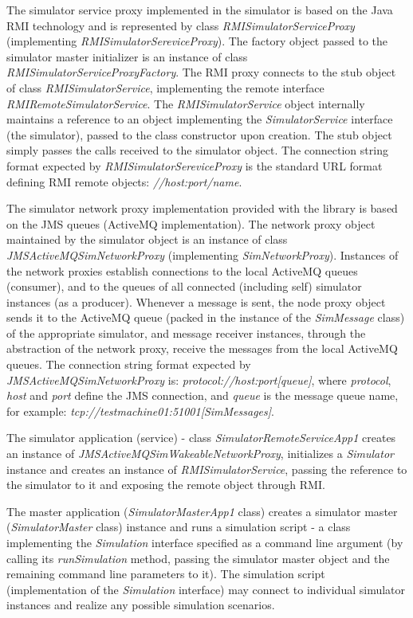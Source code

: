 The simulator service proxy implemented in the simulator is based on the Java RMI technology and is represented by class \emph{RMISimulatorServiceProxy} (implementing \emph{RMISimulatorSereviceProxy}). The factory object passed to the simulator master initializer is an instance of class \emph{RMISimulatorServiceProxyFactory}. The RMI proxy connects to the stub object of class \emph{RMISimulatorService}, implementing the remote interface \emph{RMIRemoteSimulatorService}. The \emph{RMISimulatorService} object internally maintains a reference to an object implementing the \emph{SimulatorService} interface (the simulator), passed to the class constructor upon creation. The stub object simply passes the calls received to the simulator object. The connection string format expected by \emph{RMISimulatorSereviceProxy} is the standard URL format defining RMI remote objects: \emph{//host:port/name}.

The simulator network proxy implementation provided with the library is based on the JMS queues (ActiveMQ implementation). The network proxy object maintained by the simulator object is an instance of class \emph{JMSActiveMQSimNetworkProxy} (implementing \emph{SimNetworkProxy}). Instances of the network proxies establish connections to the local ActiveMQ queues (consumer), and to the queues of all connected (including self) simulator instances (as a producer). Whenever a message is sent, the node proxy object sends it to the ActiveMQ queue (packed in the instance of the \emph{SimMessage} class) of the appropriate simulator, and message receiver instances, through the abstraction of the network proxy, receive the messages from the local ActiveMQ queues. The connection string format expected by \emph{JMSActiveMQSimNetworkProxy} is: \emph{protocol://host:port[queue]}, where \emph{protocol}, \emph{host} and \emph{port} define the JMS connection, and \emph{queue} is the message queue name, for example: \emph{tcp://testmachine01:51001[SimMessages]}.

The simulator application (service) - class \emph{SimulatorRemoteServiceApp1} creates an instance of \emph{JMSActiveMQSimWakeableNetworkProxy}, initializes a \emph{Simulator} instance and creates an instance of \emph{RMISimulatorService}, passing the reference to the simulator to it and exposing the remote object through RMI.

The master application (\emph{SimulatorMasterApp1} class) creates a simulator master (\emph{SimulatorMaster} class) instance and runs a simulation script - a class implementing the \emph{Simulation} interface specified as a command line argument (by calling its \emph{runSimulation} method, passing the simulator master object and the remaining command line parameters to it). The simulation script (implementation of the \emph{Simulation} interface) may connect to individual simulator instances and realize any possible simulation scenarios.



